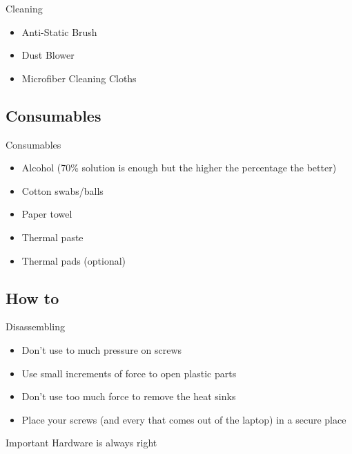 \documentclass{beamer}
\begin{document}
\begin{frame}{Cleaning}
    \begin{itemize}
        \item Anti-Static Brush
        \item Dust Blower
        \item Microfiber Cleaning Cloths
    \end{itemize}
\end{frame}

\subsection{Consumables}

\begin{frame}{Consumables}
    \begin{itemize}
      \item Alcohol (70\% solution is enough but the higher the percentage the better)
      \item Cotton swabs/balls
      \item Paper towel
      \item Thermal paste
      \item Thermal pads (optional)
    \end{itemize}
\end{frame}

\subsection{How to}

\begin{frame}{Disassembling}
    \begin{itemize}
      \item Don't use to much pressure on screws
      \item Use small increments of force to open plastic parts
      \item Don't use too much force to remove the heat sinks
      \item Place your screws (and every that comes out of the laptop) in a secure place
    \end{itemize}
    \begin{alertblock}{Important}
        Hardware is always right
    \end{alertblock}
\end{frame}
\end{document}
